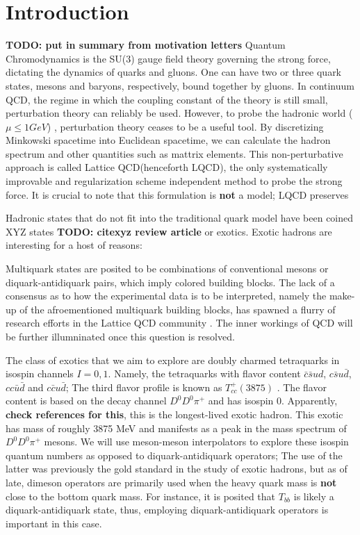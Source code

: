 
\chapter{Introduction}
\label{sec:intro}
\newcommand{\todo}[1]{\textbf{\color{red}TODO: #1}}

\todo{put in summary from motivation letters}
Quantum Chromodynamics is the SU(3) gauge field theory governing the strong force, dictating the dynamics of quarks and gluons. One can have two or three quark states, mesons and baryons, respectively, bound together by gluons. In continuum QCD, the regime in which the coupling constant of the theory is still small, perturbation theory can reliably be used. However, to probe the hadronic world ($\mu \leq 1 GeV$) , perturbation theory ceases to be a useful tool. By discretizing Minkowski spacetime into Euclidean spacetime, we can calculate the hadron spectrum and other quantities such as mattrix elements.
This non-perturbative approach is called Lattice QCD(henceforth LQCD), the only systematically improvable and regularization scheme independent method to probe the strong force. It is crucial to note that this formulation is \textbf{not} a model; LQCD preserves


Hadronic states that do not fit into the traditional quark model have been coined XYZ states \todo{cite{xyz review article}} or exotics. Exotic hadrons are interesting for a host of reasons:

Multiquark states are posited to be combinations of conventional mesons or diquark-antidiquark pairs, which imply colored building blocks. The lack of a consensus as to how the experimental data is to be interpreted, namely the make-up of the afroementioned multiquark building blocks, has spawned a flurry of research efforts in the Lattice QCD community \cite{Cheung_2017}. The inner workings of QCD will be further illumninated once this question is resolved. 


The class of exotics that we aim to explore are doubly charmed tetraquarks in isospin channels $I=0,1$. Namely, the tetraquarks with flavor content $\bar c\bar s ud$, $c\bar s u\bar d$, $cc\bar u\bar d$ and $c\bar c u\bar d$; The third flavor profile is known as $T_{cc}^+(3875)$ \cite{LHCb:2021vvq}. The flavor content is based on the decay channel $D^0D^0\pi^+$ and has isospin 0. Apparently, \textbf{check references for this}, this is the longest-lived exotic hadron. This exotic has mass of roughly 3875 MeV and manifests as a peak in the mass spectrum of $D^0D^0\pi^+$ mesons.  We will use meson-meson interpolators to explore these isospin quantum numbers as opposed to diquark-antidiquark operators; The use of the latter was previously the gold standard in the study of exotic hadrons, but as of late, dimeson operators are primarily used when the heavy quark mass is \textbf{not} close to the bottom quark mass. For instance, it is posited that $T_{bb}$ is likely a diquark-antidiquark state, thus, employing diquark-antidiquark operators is important in this case.  

